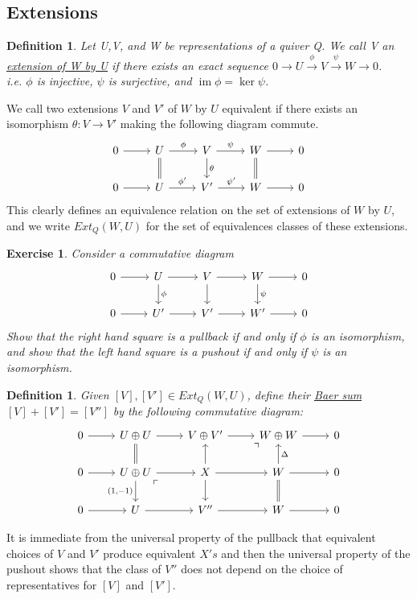\documentclass{book}
\newtheorem{definition}[theorem]{Definition}
\newtheorem {exercise}[theorem] {Exercise}
\DeclareMathOperator{\im}{im}
\begin{document}
	\subsection{Extensions}
		\begin{definition} 
			Let U,V, and W be representations of a quiver Q. We call V an \underline{extension of W by U} if there exists an exact sequence $0 \rightarrow U \xrightarrow{\phi} V 				\xrightarrow{\psi} W \rightarrow 0$. \\ i.e. $\phi$ is injective, $\psi$ is surjective, and $\im \phi = \ker \psi$.
		\end{definition}
	We call two extensions $V$ and $V'$ of $W$ by $U$ equivalent if there exists an isomorphism $\theta : V \rightarrow V'$ making the following diagram commute.
		\[ \begin{tikzcd}
		0 \arrow{r} & U \arrow[equal]{d} \arrow{r}{\phi}& V \arrow{r}{\psi}\arrow{d}{\theta} & W  \arrow[equal]{d} \arrow{r} & 0 \\
		0 \arrow{r} & U \arrow{r}{\phi '} & V' \arrow{r}{\psi '} & W \arrow{r}& 0 
		\end{tikzcd}\]
	This clearly defines an equivalence relation on the set of extensions of $W$ by $U$, and we write $ Ext_Q(W,U)$ for the set of equivalences classes of these extensions. 

		\begin{exercise}
			Consider a commutative diagram 
			\[ \begin{tikzcd}
			0 \arrow{r} & U \arrow{d}{\phi} \arrow{r}& V \arrow{r}\arrow{d} & W  \arrow{d}{\psi} \arrow{r} & 0 \\
			0 \arrow{r} & U' \arrow{r} & V' \arrow{r} & W' \arrow{r}& 0 
			\end{tikzcd}\]
			Show that the right hand square is a pullback if and only if $\phi$ is an isomorphism, and show that the left hand square is a pushout if and only if $\psi$ is an isomorphism.
		\end{exercise}
		\begin{definition} 
			Given $[V],[V'] \in Ext_Q(W,U)$, define their \underline{Baer sum} $[V]+[V']=[V'']$ by the following commutative diagram:
			\[ \begin{tikzcd}
			0 \arrow{r} & U \oplus U \arrow[equal]{d} \arrow{r}& V \oplus V' \arrow{r} & W \oplus W \arrow{r}  \arrow[dl, phantom, "\urcorner", very near start] & 0 \\
			0 \arrow{r} & U \oplus U  \arrow[dr, phantom, "\ulcorner", very near start] \arrow[d, "(1 \text{,}-1)"'] \arrow{r} & X \arrow{r}\arrow{u} \arrow{d} & W \arrow[u, "\Delta"'] \arrow{r}\arrow[equal]{d}& 0 \\
			0 \arrow{r} & U \arrow{r} & V'' \arrow{r} & W \arrow{r}& 0 
			\end{tikzcd}\]
		\end{definition}
	It is immediate from the universal property of the pullback that equivalent choices of $V$ and $V'$ produce equivalent $X's$ and then the universal property of the pushout shows that the class of $V''$ does not depend on the choice of representatives for $[V]$ and $[V']$. 
\end{document}
